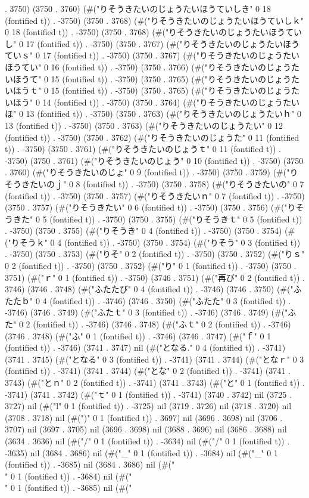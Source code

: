 . 3750) (3750 . 3760) (#("りそうきたいのじょうたいほうていしき" 0 18 (fontified t)) . -3750) (3750 . 3768) (#("りそうきたいのじょうたいほうていしｋ" 0 18 (fontified t)) . -3750) (3750 . 3768) (#("りそうきたいのじょうたいほうていし" 0 17 (fontified t)) . -3750) (3750 . 3767) (#("りそうきたいのじょうたいほうていｓ" 0 17 (fontified t)) . -3750) (3750 . 3767) (#("りそうきたいのじょうたいほうてい" 0 16 (fontified t)) . -3750) (3750 . 3766) (#("りそうきたいのじょうたいほうて" 0 15 (fontified t)) . -3750) (3750 . 3765) (#("りそうきたいのじょうたいほうｔ" 0 15 (fontified t)) . -3750) (3750 . 3765) (#("りそうきたいのじょうたいほう" 0 14 (fontified t)) . -3750) (3750 . 3764) (#("りそうきたいのじょうたいほ" 0 13 (fontified t)) . -3750) (3750 . 3763) (#("りそうきたいのじょうたいｈ" 0 13 (fontified t)) . -3750) (3750 . 3763) (#("りそうきたいのじょうたい" 0 12 (fontified t)) . -3750) (3750 . 3762) (#("りそうきたいのじょうた" 0 11 (fontified t)) . -3750) (3750 . 3761) (#("りそうきたいのじょうｔ" 0 11 (fontified t)) . -3750) (3750 . 3761) (#("りそうきたいのじょう" 0 10 (fontified t)) . -3750) (3750 . 3760) (#("りそうきたいのじょ" 0 9 (fontified t)) . -3750) (3750 . 3759) (#("りそうきたいのｊ" 0 8 (fontified t)) . -3750) (3750 . 3758) (#("りそうきたいの" 0 7 (fontified t)) . -3750) (3750 . 3757) (#("りそうきたいｎ" 0 7 (fontified t)) . -3750) (3750 . 3757) (#("りそうきたい" 0 6 (fontified t)) . -3750) (3750 . 3756) (#("りそうきた" 0 5 (fontified t)) . -3750) (3750 . 3755) (#("りそうきｔ" 0 5 (fontified t)) . -3750) (3750 . 3755) (#("りそうき" 0 4 (fontified t)) . -3750) (3750 . 3754) (#("りそうｋ" 0 4 (fontified t)) . -3750) (3750 . 3754) (#("りそう" 0 3 (fontified t)) . -3750) (3750 . 3753) (#("りそ" 0 2 (fontified t)) . -3750) (3750 . 3752) (#("りｓ" 0 2 (fontified t)) . -3750) (3750 . 3752) (#("り" 0 1 (fontified t)) . -3750) (3750 . 3751) (#("ｒ" 0 1 (fontified t)) . -3750) (3746 . 3751) (#("再び" 0 2 (fontified t)) . 3746) (3746 . 3748) (#("ふたたび" 0 4 (fontified t)) . -3746) (3746 . 3750) (#("ふたたｂ" 0 4 (fontified t)) . -3746) (3746 . 3750) (#("ふたた" 0 3 (fontified t)) . -3746) (3746 . 3749) (#("ふたｔ" 0 3 (fontified t)) . -3746) (3746 . 3749) (#("ふた" 0 2 (fontified t)) . -3746) (3746 . 3748) (#("ふｔ" 0 2 (fontified t)) . -3746) (3746 . 3748) (#("ふ" 0 1 (fontified t)) . -3746) (3746 . 3747) (#("ｆ" 0 1 (fontified t)) . -3746) (3741 . 3747) nil (#("となる." 0 4 (fontified t)) . -3741) (3741 . 3745) (#("となる" 0 3 (fontified t)) . -3741) (3741 . 3744) (#("となｒ" 0 3 (fontified t)) . -3741) (3741 . 3744) (#("とな" 0 2 (fontified t)) . -3741) (3741 . 3743) (#("とｎ" 0 2 (fontified t)) . -3741) (3741 . 3743) (#("と" 0 1 (fontified t)) . -3741) (3741 . 3742) (#("ｔ" 0 1 (fontified t)) . -3741) (3740 . 3742) nil (3725 . 3727) nil (#("l" 0 1 (fontified t)) . -3725) nil (3719 . 3726) nil (3718 . 3720) nil (3708 . 3718) nil (#(")" 0 1 (fontified t)) . 3697) nil (3696 . 3698) nil (3706 . 3707) nil (3697 . 3705) nil (3696 . 3698) nil (3688 . 3696) nil (3686 . 3688) nil (3634 . 3636) nil (#("/" 0 1 (fontified t)) . -3634) nil (#("/" 0 1 (fontified t)) . -3635) nil (3684 . 3686) nil (#("_" 0 1 (fontified t)) . -3684) nil (#("_" 0 1 (fontified t)) . -3685) nil (3684 . 3686) nil (#("\\" 0 1 (fontified t)) . -3684) nil (#("\\" 0 1 (fontified t)) . -3685) nil (#("
